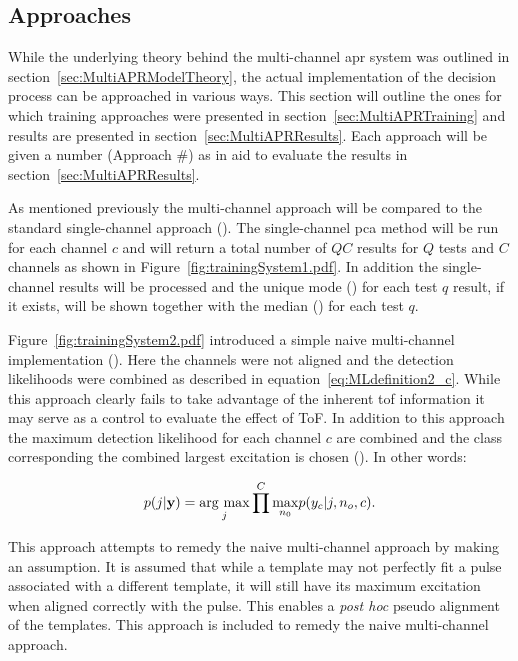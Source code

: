 \subsection{Approaches}
While the underlying theory behind the multi-channel \gls{apr} system was outlined in section~\ref{sec:MultiAPRModelTheory}, the actual implementation of the decision process can be approached in various ways. This section will outline the ones for which training approaches were presented in section~\ref{sec:MultiAPRTraining} and results are presented in section~\ref{sec:MultiAPRResults}. Each approach will be given a number (Approach \#) as in aid to evaluate the results in section~\ref{sec:MultiAPRResults}.

As mentioned previously the multi-channel approach will be compared to the standard single-channel approach (). The single-channel \gls{pca} method will be run for each channel $c$ and will return a total number of $QC$ results for $Q$ tests and $C$ channels as shown in Figure~\ref{fig:trainingSystem1.pdf}. In addition the single-channel results will be processed and the unique mode () for each test $q$ result, if it exists, will be shown together with the median () for each test $q$.

Figure~\ref{fig:trainingSystem2.pdf} introduced a simple naive multi-channel implementation (). Here the channels were not aligned and the detection likelihoods were combined as described in equation~\ref{eq:MLdefinition2_c}. While this approach clearly fails to take advantage of the inherent \gls{tof} information it may serve as a control to evaluate the effect of ToF. In addition to this approach the maximum detection likelihood for each channel $c$ are combined and the class corresponding the combined largest excitation is chosen (). In other words:

\begin{equation}\label{eq:jointprob3_c}
p(j|\textbf{y}) = \underset{j}{\mathrm{arg~max}} \prod^C \underset{n_0}{\max} p(y_c|j,n_o,c).
\end{equation}

This approach attempts to remedy the naive multi-channel approach by making an assumption. It is assumed that while a template may not perfectly fit a pulse associated with a different template, it will still have its maximum excitation when aligned correctly with the pulse. This enables a \emph{post hoc} pseudo alignment of the templates. This approach is included to remedy the naive multi-channel approach.

